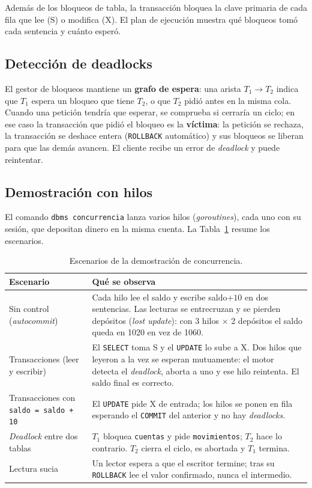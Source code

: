 \documentclass[11pt,a4paper]{article}
\begin{document}
Además de los bloqueos de tabla, la transacción bloquea la clave primaria de cada fila que lee (S) o modifica (X). El plan de ejecución muestra qué bloqueos tomó cada sentencia y cuánto esperó.

\subsection{Detección de deadlocks}

El gestor de bloqueos mantiene un \textbf{grafo de espera}: una arista $T_1 \rightarrow T_2$ indica que $T_1$ espera un bloqueo que tiene $T_2$, o que $T_2$ pidió antes en la misma cola. Cuando una petición tendría que esperar, se comprueba si cerraría un ciclo; en ese caso la transacción que pidió el bloqueo es la \textbf{víctima}: la petición se rechaza, la transacción se deshace entera (\texttt{ROLLBACK} automático) y sus bloqueos se liberan para que las demás avancen. El cliente recibe un error de \emph{deadlock} y puede reintentar.

\subsection{Demostración con hilos}

El comando \texttt{dbms concurrencia} lanza varios hilos (\emph{goroutines}), cada uno con su sesión, que depositan dinero en la misma cuenta. La Tabla~\ref{tab:concurrencia} resume los escenarios.

\begin{table}[H]
  \centering
  \small
  \begin{tabular}{@{}p{4.6cm}p{10cm}@{}}
    \toprule
    \textbf{Escenario} & \textbf{Qué se observa} \\
    \midrule
    Sin control (\emph{autocommit}) & Cada hilo lee el saldo y escribe saldo$+10$ en dos sentencias. Las lecturas se entrecruzan y se pierden depósitos (\emph{lost update}): con 3 hilos $\times$ 2 depósitos el saldo queda en 1020 en vez de 1060. \\
    Transacciones (leer y escribir) & El \texttt{SELECT} toma S y el \texttt{UPDATE} lo sube a X. Dos hilos que leyeron a la vez se esperan mutuamente: el motor detecta el \emph{deadlock}, aborta a uno y ese hilo reintenta. El saldo final es correcto. \\
    Transacciones con \texttt{saldo = saldo + 10} & El \texttt{UPDATE} pide X de entrada; los hilos se ponen en fila esperando el \texttt{COMMIT} del anterior y no hay \emph{deadlocks}. \\
    \emph{Deadlock} entre dos tablas & $T_1$ bloquea \texttt{cuentas} y pide \texttt{movimientos}; $T_2$ hace lo contrario. $T_2$ cierra el ciclo, es abortada y $T_1$ termina. \\
    Lectura sucia & Un lector espera a que el escritor termine; tras su \texttt{ROLLBACK} lee el valor confirmado, nunca el intermedio. \\
    \bottomrule
  \end{tabular}
  \caption{Escenarios de la demostración de concurrencia.}
  \label{tab:concurrencia}
\end{table}
\end{document}
